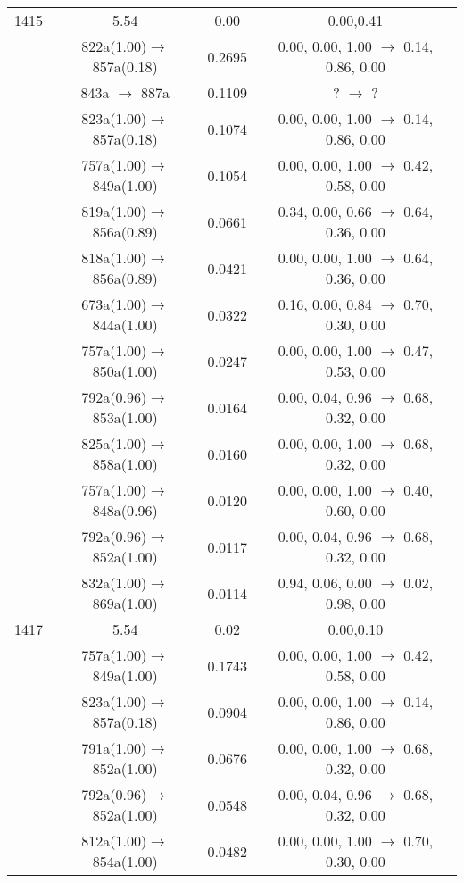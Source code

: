 \documentclass[10pt,a4paper]{article}
\begin{document}
\begin{longtable}{c|c|c|c}
 \hline1415 &	 5.54 &	 0.00 &	 0.00,0.41 \\ 
  	& 822a(1.00)$\rightarrow$857a(0.18) &	 0.2695 &	 0.00, 0.00, 1.00 $\rightarrow$ 0.14, 0.86, 0.00 \\ 
 	& 843a $\rightarrow$ 887a &	 0.1109 &	 ? $\rightarrow$ ?  \\ 
 	& 823a(1.00)$\rightarrow$857a(0.18) &	 0.1074 &	 0.00, 0.00, 1.00 $\rightarrow$ 0.14, 0.86, 0.00 \\ 
 	& 757a(1.00)$\rightarrow$849a(1.00) &	 0.1054 &	 0.00, 0.00, 1.00 $\rightarrow$ 0.42, 0.58, 0.00 \\ 
 	& 819a(1.00)$\rightarrow$856a(0.89) &	 0.0661 &	 0.34, 0.00, 0.66 $\rightarrow$ 0.64, 0.36, 0.00 \\ 
 	& 818a(1.00)$\rightarrow$856a(0.89) &	 0.0421 &	 0.00, 0.00, 1.00 $\rightarrow$ 0.64, 0.36, 0.00 \\ 
 	& 673a(1.00)$\rightarrow$844a(1.00) &	 0.0322 &	 0.16, 0.00, 0.84 $\rightarrow$ 0.70, 0.30, 0.00 \\ 
 	& 757a(1.00)$\rightarrow$850a(1.00) &	 0.0247 &	 0.00, 0.00, 1.00 $\rightarrow$ 0.47, 0.53, 0.00 \\ 
 	& 792a(0.96)$\rightarrow$853a(1.00) &	 0.0164 &	 0.00, 0.04, 0.96 $\rightarrow$ 0.68, 0.32, 0.00 \\ 
 	& 825a(1.00)$\rightarrow$858a(1.00) &	 0.0160 &	 0.00, 0.00, 1.00 $\rightarrow$ 0.68, 0.32, 0.00 \\ 
 	& 757a(1.00)$\rightarrow$848a(0.96) &	 0.0120 &	 0.00, 0.00, 1.00 $\rightarrow$ 0.40, 0.60, 0.00 \\ 
 	& 792a(0.96)$\rightarrow$852a(1.00) &	 0.0117 &	 0.00, 0.04, 0.96 $\rightarrow$ 0.68, 0.32, 0.00 \\ 
 	& 832a(1.00)$\rightarrow$869a(1.00) &	 0.0114 &	 0.94, 0.06, 0.00 $\rightarrow$ 0.02, 0.98, 0.00 \\ 
 \hline1417 &	 5.54 &	 0.02 &	 0.00,0.10 \\ 
  	& 757a(1.00)$\rightarrow$849a(1.00) &	 0.1743 &	 0.00, 0.00, 1.00 $\rightarrow$ 0.42, 0.58, 0.00 \\ 
 	& 823a(1.00)$\rightarrow$857a(0.18) &	 0.0904 &	 0.00, 0.00, 1.00 $\rightarrow$ 0.14, 0.86, 0.00 \\ 
 	& 791a(1.00)$\rightarrow$852a(1.00) &	 0.0676 &	 0.00, 0.00, 1.00 $\rightarrow$ 0.68, 0.32, 0.00 \\ 
 	& 792a(0.96)$\rightarrow$852a(1.00) &	 0.0548 &	 0.00, 0.04, 0.96 $\rightarrow$ 0.68, 0.32, 0.00 \\ 
 	& 812a(1.00)$\rightarrow$854a(1.00) &	 0.0482 &	 0.00, 0.00, 1.00 $\rightarrow$ 0.70, 0.30, 0.00 \\ 

\end{longtable}
\end{document}
